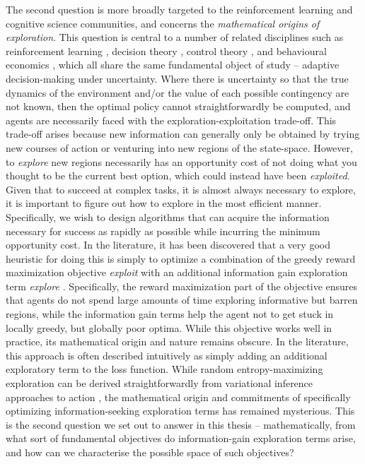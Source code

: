 The second question is more broadly targeted to the reinforcement learning and cognitive science communities, and concerns the \emph{mathematical origins of exploration}. This question is central to a number of related disciplines such as reinforcement learning \citep{sutton2018reinforcement}, decision theory \citep{daw2006cortical}, control theory \citep{kalman1960contributions}, and behavioural economics \citep{tversky1974judgment}, which all share the same fundamental object of study -- adaptive decision-making under uncertainty. Where there is uncertainty so that the true dynamics of the environment and/or the value of each possible contingency are not known, then the optimal policy cannot straightforwardly be computed, and agents are necessarily faced with the exploration-exploitation trade-off. This trade-off arises because new information can generally only be obtained by trying new courses of action or venturing into new regions of the state-space. However, to \emph{explore} new regions necessarily has an opportunity cost of not doing what you thought to be the current best option, which could instead have been \emph{exploited}. Given that to succeed at complex tasks, it is almost always necessary to explore, it is important to figure out how to explore in the most efficient manner. Specifically, we wish to design algorithms that can acquire the information necessary for success as rapidly as possible while incurring the minimum opportunity cost. In the literature, it has been discovered that a very good heuristic for doing this is simply to optimize a combination of the greedy reward maximization objective \emph{exploit} with an additional information gain exploration term \emph{explore} \citep{shyam_model-based_2019,schmidhuber2007simple,tschantz2020reinforcement}. Specifically, the reward maximization part of the objective ensures that agents do not spend large amounts of time exploring informative but barren regions, while the information gain terms help the agent not to get stuck in locally greedy, but globally poor optima. While this objective works well in practice, its mathematical origin and nature remains obscure. In the literature, this approach is often described intuitively as simply adding an additional exploratory term to the loss function. While random entropy-maximizing exploration can be derived straightforwardly from variational inference approaches to action \citep{levine2018reinforcement}, the mathematical origin and commitments of specifically optimizing information-seeking exploration terms has remained mysterious. This is the second question we set out to answer in this thesis -- mathematically, from what sort of fundamental objectives do information-gain exploration terms arise, and how can we characterise the possible space of such objectives?

